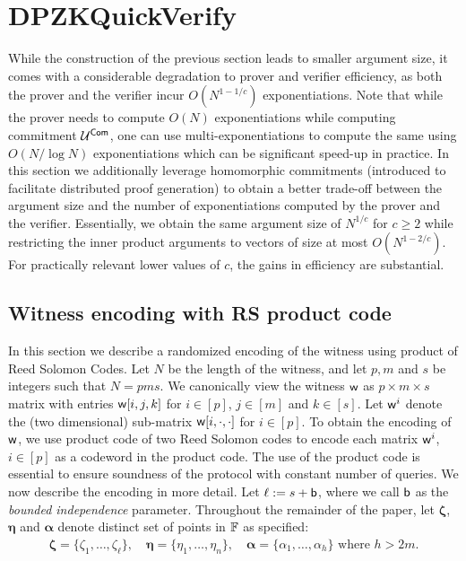 

\section{DPZKQuickVerify} \label{sec:quickverify}
While the construction of the previous section leads to smaller argument size,
it comes with a considerable degradation to prover and verifier efficiency, as
both the prover and the verifier incur $O(N^{1-1/c})$ exponentiations. Note
that while the prover needs to compute $O(N)$ exponentiations while computing
commitment $\mathcal{U}^{\mathsf{Com}}$, one can use multi-exponentiations to compute the same
using $O(N/\log{N})$ exponentiations which can be significant speed-up in
practice. In this section we additionally leverage homomorphic commitments
(introduced to facilitate distributed proof generation) to obtain a better
trade-off between the argument size and the number of exponentiations computed
by the prover and the verifier. Essentially, we obtain the same argument size
of $N^{1/c}$ for $c\geq 2$ while restricting the inner product arguments to
vectors of size at most $O(N^{1-2/c})$. For practically relevant lower values
of $c$, the gains in efficiency are substantial.
   

\subsection{Witness encoding with RS product code}\label{sec:witencoding}
In this section we describe a randomized encoding of the witness using product
of Reed Solomon Codes. Let $N$ be the length of the witness, and let $p,m$ and
$s$ be integers such that $N=pms$. We canonically view the
witness $\mathsf{w}$ 
as $p\times m\times s$ matrix with entries $\mathsf{w}[i,j,k]$ for $i\in [p]$,
$j\in [m]$ and $k\in [s]$. Let $\mathsf{w}^i$ denote the (two dimensional) sub-matrix
$\mathsf{w}[i,\cdot,\cdot]$ for $i\in [p]$. To obtain the encoding of
$\mathsf{w}$, we use product code of two Reed Solomon codes to encode each matrix
$\mathsf{w}^i$,
$i\in [p]$ as a codeword in the product code. The use of the product code is
essential to ensure soundness of the protocol with constant number of queries.
We now describe the encoding in more detail. Let $\ell := s + \mathsf{b}$, where we
call $\mathsf{b}$ as the {\em bounded independence} parameter. 
Throughout the remainder of the paper, let $\bm{\zeta}$, $\bm{\eta}$ and
$\bm{\alpha}$ denote distinct set of points in $\mathbb{F}$ as specified:
\begin{align}\label{eq:points}
\bm{\zeta} =\{\zeta_1,\ldots,\zeta_{\ell}\},\quad 
\bm{\eta}  = \{\eta_1,\ldots,\eta_n \},\quad
\bm{\alpha} = \{\alpha_1,\ldots,\alpha_{h}\} \text{ where } h>2m. 
\end{align}

